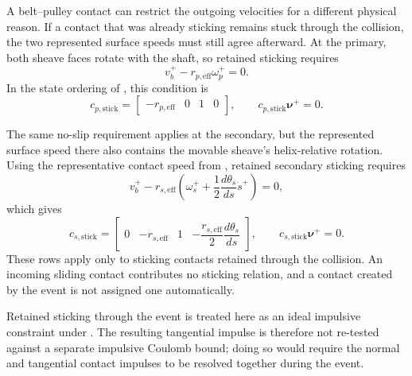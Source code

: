 \documentclass[11pt]{report}
\numberwithin{equation}{section}
\newcounter{assump}
\begin{document}
A belt--pulley contact can restrict the outgoing velocities for a different
physical reason. If a contact that was already sticking remains stuck through
the collision, the two represented surface speeds must still agree afterward.
At the primary, both sheave faces rotate with the shaft, so retained sticking
requires
\begin{equation}
    v_b^+
    -
    r_{p,\mathrm{eff}}\omega_p^+
    =0.
    \label{eq:finite_event_primary_stick_velocity}
\end{equation}
In the state ordering of , this
condition is
\begin{equation}
    c_{p,\mathrm{stick}}
    =
    \begin{bmatrix}
        -r_{p,\mathrm{eff}} & 0 & 1 & 0
    \end{bmatrix},
    \qquad
    c_{p,\mathrm{stick}}\boldsymbol{\nu}^+=0.
    \label{eq:finite_event_primary_stick_constraint}
\end{equation}

The same no-slip requirement applies at the secondary, but the represented
surface speed there also contains the movable sheave's helix-relative
rotation. Using the representative contact speed from
, retained secondary sticking
requires
\begin{equation}
    v_b^+
    -
    r_{s,\mathrm{eff}}
    \left(
        \omega_s^+
        +
        \frac{1}{2}\frac{d\theta_s}{ds}\dot s^+
    \right)
    =0,
    \label{eq:finite_event_secondary_stick_velocity}
\end{equation}
which gives
\begin{equation}
    c_{s,\mathrm{stick}}
    =
    \begin{bmatrix}
        0 &
        -r_{s,\mathrm{eff}} &
        1 &
        -\dfrac{r_{s,\mathrm{eff}}}{2}\dfrac{d\theta_s}{ds}
    \end{bmatrix},
    \qquad
    c_{s,\mathrm{stick}}\boldsymbol{\nu}^+=0.
    \label{eq:finite_event_secondary_stick_constraint}
\end{equation}
These rows apply only to sticking contacts retained through the collision. An
incoming sliding contact contributes no sticking relation, and a contact
created by the event is not assigned one automatically.

Retained sticking through the event is treated here as an ideal impulsive
constraint under .  The resulting
tangential impulse is therefore not re-tested against a separate impulsive
Coulomb bound; doing so would require the normal and tangential contact
impulses to be resolved together during the event.
\end{document}
